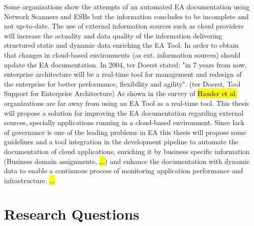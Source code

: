 Some organizations show the attempts of an automated EA documentation using Network Scanners and ESBs but the information concludes to be incomplete and not up-to-date. 
The use of external information sources such as cloud providers will increase the actuality and data quality of the information delivering structured static and dynamic data enriching the EA Tool. In order to obtain that changes in cloud-based environments (as ext. information sources) should update the EA documentation.
In 2004, ter Doerst stated: "in 7 years from now, enterprise architecture will be a real-time tool for management and redesign of the enterprise for better performance, flexibility and agility". (ter Doerst, Tool Support for Enterprise Architecture)
As shown in the survey of \hl{Hauder et al.} organizations are far away from using an EA Tool as a real-time tool. This thesis will propose a solution for improving the EA documentation regarding external sources, specially applications running in a cloud-based environment. Since lack of governance is one of the leading problems in EA this thesis will propose some guidelines %
and a tool integration in the development pipeline to automate the documentation of cloud applications, enriching it by business specific information (Business domain assignments, \hl{...}) and enhance the documentation with dynamic data to enable a continuous process of monitoring application performance and infrastructure.
\hl{ ... }

\section{Research Questions}


